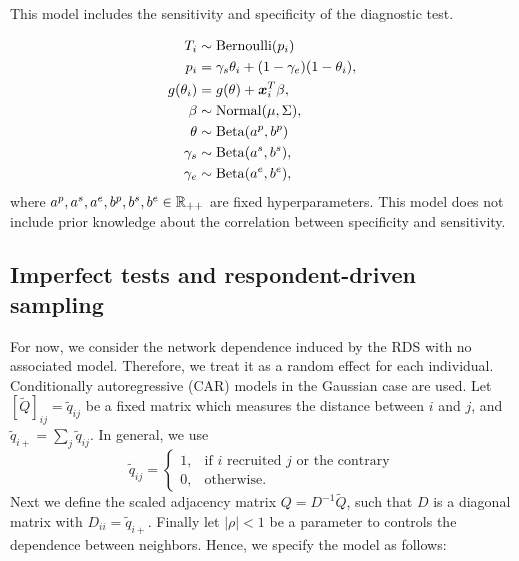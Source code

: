 This model includes the sensitivity and specificity of the diagnostic test. 

\begin{equation}
  \begin{aligned}
    T_i &\sim \operatorname{Bernoulli}(p_i) \\
    p_i &= \gamma_s\theta_i + (1-\gamma_e)(1 - \theta_i),  \\
    g(\theta_i) &= g(\theta) + \boldsymbol{x}_i^T\beta,  \\
    \beta &\sim \operatorname{Normal}(\mu, \Sigma), \\ 
    \theta &\sim \operatorname{Beta}(a^p, b^p) \\
    \gamma_s &\sim \operatorname{Beta}(a^s, b^s), \\
    \gamma_e &\sim \operatorname{Beta}(a^e, b^e), \\    
  \end{aligned}  
\end{equation}
where $a^p, a^s, a^e, b^p, b^s, b^e \in \mathbb{R}_{++}$ are fixed hyperparameters.
This model does not include prior knowledge about the correlation between
specificity and sensitivity. 

\subsection{Imperfect tests and respondent-driven sampling}

For now, we consider the network dependence induced by the RDS with no
associated model. Therefore, we treat it as a random effect for
each individual. Conditionally autoregressive (CAR) models in the
Gaussian case are used. Let $[\tilde{Q}]_{ij} = \tilde{q}_{ij}$ be a fixed matrix which measures the distance between $i$
and $j$, and $\tilde{q}_{i+} = \sum_{j} \tilde{q}_{ij}$. In general, we use
$$
\tilde{q}_{ij} = \begin{cases}
  1, &\text{if } i \text{ recruited } j \text{ or the contrary} \\
  0, &\text{otherwise.} 
\end{cases}
$$
Next we define the scaled adjacency matrix $Q = D^{-1}\tilde{Q}$, such that $D$
is a diagonal matrix with $D_{ii} = \tilde{q}_{i+}$. Finally let $|\rho| < 1$ be a
parameter to controls the dependence between neighbors. Hence, we specify the
model as follows:


